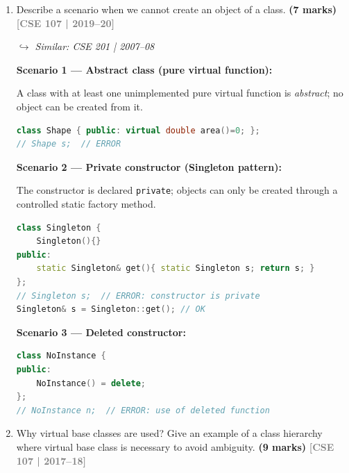 \documentclass[12pt,a3paper]{article}
\newcommand{\yr}[1]{\hfill\textcolor{gray}{\small\textbf{[#1]}}}
\newcommand{\mk}[1]{\textcolor{orange!70!black}{\small\textbf{(#1 marks)}}}
\newcommand{\variant}[1]{\par\vspace{1pt}\textcolor{blue!50!black}%
  {\footnotesize\textit{$\hookrightarrow$ Similar: #1}}}
\begin{document}
\begin{enumerate}
\begin{tcolorbox}[enhanced,breakable,ansbox,colback=cG!4,colframe=cG,
  boxrule=0.8pt,arc=5pt,
  title={\textbf{Answer --- Compile-time vs run-time polymorphism}},
  fonttitle=\bfseries\color{white},colbacktitle=cG]
\end{tcolorbox}


\item Describe a scenario when we cannot create an object of a class. \mk{7}
\yr{CSE 107 | 2019--20}
\variant{CSE 201 | 2007--08}
\begin{tcolorbox}[enhanced,breakable,ansbox,colback=cG!4,colframe=cG,
  boxrule=0.8pt,arc=5pt,
  title={\textbf{Answer --- Scenario when an object of a class cannot be created}},
  fonttitle=\bfseries\color{white},colbacktitle=cG]

\textbf{Scenario 1 --- Abstract class (pure virtual function):}

A class with at least one unimplemented pure virtual function is
\emph{abstract}; no object can be created from it.

\begin{lstlisting}[language=C++]
class Shape { public: virtual double area()=0; };
// Shape s;  // ERROR
\end{lstlisting}

\textbf{Scenario 2 --- Private constructor (Singleton pattern):}

The constructor is declared \texttt{private}; objects can only be
created through a controlled static factory method.

\begin{lstlisting}[language=C++]
class Singleton {
    Singleton(){}
public:
    static Singleton& get(){ static Singleton s; return s; }
};
// Singleton s;  // ERROR: constructor is private
Singleton& s = Singleton::get(); // OK
\end{lstlisting}

\textbf{Scenario 3 --- Deleted constructor:}

\begin{lstlisting}[language=C++]
class NoInstance {
public:
    NoInstance() = delete;
};
// NoInstance n;  // ERROR: use of deleted function
\end{lstlisting}

\end{tcolorbox}


\item Why virtual base classes are used? Give an example of a class hierarchy where virtual base class is necessary to avoid ambiguity. \mk{9}
\yr{CSE 107 | 2017--18}

\begin{tcolorbox}[enhanced,breakable,ansbox,colback=cG!4,colframe=cG,
  boxrule=0.8pt,arc=5pt,
  title={\textbf{Answer --- Virtual base class --- why and when needed}},
  fonttitle=\bfseries\color{white},colbacktitle=cG]


\end{tcolorbox}
\end{enumerate}
\end{document}
